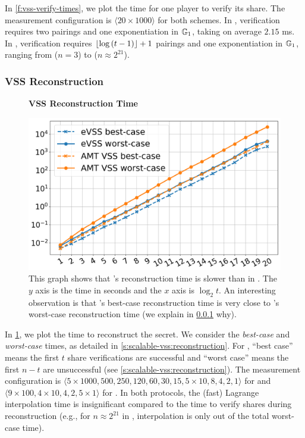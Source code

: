 In \cref{f:vss-verify-times}, we plot the time for one player to verify its share.
The measurement configuration is $\langle 20 \times 1000\rangle$ for both schemes.
In \evss, verification requires two pairings and one exponentiation in $\mathbb{G}_1$, taking on average $2.15$ ms.
In \ourvss, verification requires $\lfloor\log{(t-1)}\rfloor + 1$ pairings and one exponentiation in $\mathbb{G}_1$, ranging from  ($n=3$) to  ($n\approx 2^{21}$).

\subsubsection{VSS Reconstruction}
\label{s:eval:vss:reconstr}

\begin{figure}[t]
    \centering
    \textbf{VSS Reconstruction Time}\par\medskip
    \includegraphics[width=0.70\columnwidth]{figures-thresh/vss-reconstr-times.png}
    \caption{
        This graph shows that \ourvss's reconstruction time is slower than in \evss.
        The $y$ axis is the time in seconds and the $x$ axis is $\log_2{t}$.
        An interesting observation is that \ourvss's best-case reconstruction time is very close to \evss's worst-case reconstruction time (we explain in \cref{s:eval:vss:reconstr} why).
    }
    \label{f:vss-reconstr-times}
\end{figure}

In \cref{f:vss-reconstr-times}, we plot the time to reconstruct the secret.
We consider the \textit{best-case} and \textit{worst-case} times, as detailed in \cref{s:scalable-vss:reconstruction}.
For \evss, ``best case'' means the first $t$ share verifications are successful and ``worst case'' means the first $n-t$ are unsuccessful (see \cref{s:scalable-vss:reconstruction}).
The measurement configuration is $\langle 5 \times 1000, 500, 250, 120, 60, 30, 15, 5\times 10, 8,4,2,1\rangle$ for \evss and $\langle 9 \times 100, 4\times 10, 4,2, 5\times 1\rangle$ for \ourvss.
In both protocols, the (fast) Lagrange interpolation time is insignificant compared to the time to verify shares during reconstruction (e.g., for $n\approx 2^{21}$ in \evss, interpolation is only  out of the total  worst-case time).

